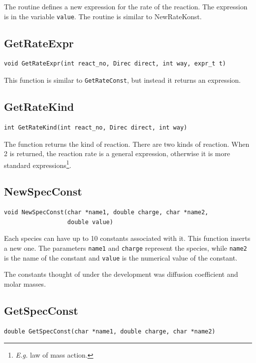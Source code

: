 The routine defines a new expression for the rate of the reaction. 
The expression is in the variable {\tt value}. The routine is 
similar to NewRateKonst.

\subsection{GetRateExpr}
\begin{verbatim}
void GetRateExpr(int react_no, Direc direct, int way, expr_t t)
\end{verbatim}

This function is similar to {\tt GetRateConst}, but instead it returns
an expression.

\subsection{GetRateKind}
\begin{verbatim}
int GetRateKind(int react_no, Direc direct, int way)
\end{verbatim}

The function returns the kind of reaction. There are two kinds of 
reaction. When 2 is returned, the reaction rate is a general
expression, otherwise it is more standard
expressions\footnote{{\em E.g.\/} law of mass action.}.

\subsection{NewSpecConst}
\label{tableman:NewSpecConst}
\begin{verbatim}
void NewSpecConst(char *name1, double charge, char *name2, 
                  double value)
\end{verbatim}

Each species can have up to 10 constants associated with it. This function 
inserts a new one. The parameters {\tt name1} and {\tt charge} represent the
species, while {\tt name2} is the name of the constant and {\tt value} is
the numerical value of the constant.

The constants thought of under the development was diffusion
coefficient and molar masses.

\subsection{GetSpecConst}
\begin{verbatim}
double GetSpecConst(char *name1, double charge, char *name2)
\end{verbatim}

